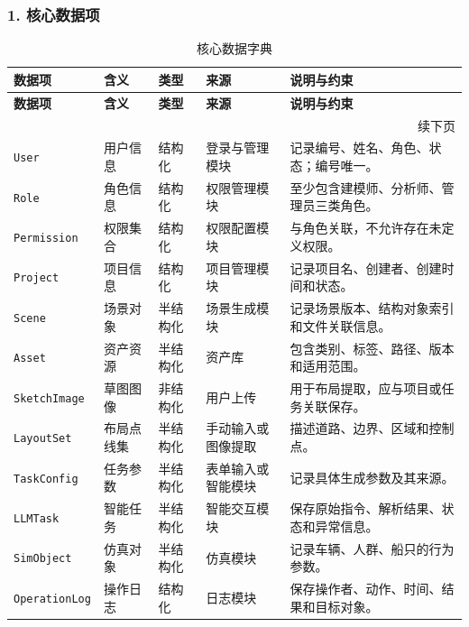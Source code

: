 \documentclass[UTF8,a4paper,10pt]{ctexart}
\begin{document}
\subsubsection*{1. 核心数据项}
{
\renewcommand{\arraystretch}{1.35}

\begin{longtable}{p{2.3cm} p{1.8cm} p{1.8cm} p{2.8cm} p{3.8cm}}
\caption{核心数据字典}\label{tab:data_dict}\\
\toprule
\rowcolor{gray!20}
\textbf{数据项} & \textbf{含义} & \textbf{类型} & \textbf{来源} & \textbf{说明与约束} \\
\midrule
\endfirsthead

\toprule
\rowcolor{gray!20}
\textbf{数据项} & \textbf{含义} & \textbf{类型} & \textbf{来源} & \textbf{说明与约束} \\
\midrule
\endhead

\midrule
\multicolumn{5}{r}{\small 续下页}\\
\endfoot

\bottomrule
\endlastfoot

\texttt{User} & 用户信息 & 结构化 & 登录与管理模块 & 记录编号、姓名、角色、状态；编号唯一。 \\
\texttt{Role} & 角色信息 & 结构化 & 权限管理模块 & 至少包含建模师、分析师、管理员三类角色。 \\
\texttt{Permission} & 权限集合 & 结构化 & 权限配置模块 & 与角色关联，不允许存在未定义权限。 \\
\texttt{Project} & 项目信息 & 结构化 & 项目管理模块 & 记录项目名、创建者、创建时间和状态。 \\
\texttt{Scene} & 场景对象 & 半结构化 & 场景生成模块 & 记录场景版本、结构对象索引和文件关联信息。 \\
\texttt{Asset} & 资产资源 & 半结构化 & 资产库 & 包含类别、标签、路径、版本和适用范围。 \\
\texttt{SketchImage} & 草图图像 & 非结构化 & 用户上传 & 用于布局提取，应与项目或任务关联保存。 \\
\texttt{LayoutSet} & 布局点线集 & 半结构化 & 手动输入或图像提取 & 描述道路、边界、区域和控制点。 \\
\texttt{TaskConfig} & 任务参数 & 半结构化 & 表单输入或智能模块 & 记录具体生成参数及其来源。 \\
\texttt{LLMTask} & 智能任务 & 半结构化 & 智能交互模块 & 保存原始指令、解析结果、状态和异常信息。 \\
\texttt{SimObject} & 仿真对象 & 半结构化 & 仿真模块 & 记录车辆、人群、船只的行为参数。 \\
\texttt{OperationLog} & 操作日志 & 结构化 & 日志模块 & 保存操作者、动作、时间、结果和目标对象。 \\
\end{longtable}
}
\end{document}
